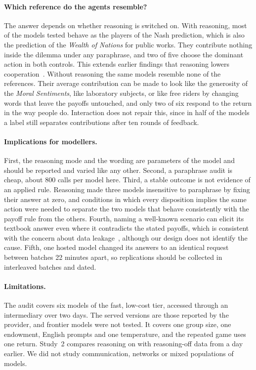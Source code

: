 \documentclass[runningheads]{llncs}
\begin{document}
\paragraph{Which reference do the agents resemble?} The answer depends on whether reasoning is switched on. With reasoning, most of the models tested behave as the players of the Nash prediction, which is also the prediction of the \emph{Wealth of Nations} for public works. They contribute nothing inside the dilemma under any paraphrase, and two of five choose the dominant action in both controls. This extends earlier findings that reasoning lowers cooperation~\cite{li2025spontaneous,kitadai2025reasoning}. Without reasoning the same models resemble none of the references. Their average contribution can be made to look like the generosity of the \emph{Moral Sentiments}, like laboratory subjects, or like free riders by changing words that leave the payoffs untouched, and only two of six respond to the return in the way people do. Interaction does not repair this, since in half of the models a label still separates contributions after ten rounds of feedback.

\paragraph{Implications for modellers.} First, the reasoning mode and the wording are parameters of the model and should be reported and varied like any other. Second, a paraphrase audit is cheap, about 800 calls per model here. Third, a stable outcome is not evidence of an applied rule. Reasoning made three models insensitive to paraphrase by fixing their answer at zero, and conditions in which every disposition implies the same action were needed to separate the two models that behave consistently with the payoff rule from the others. Fourth, naming a well-known scenario can elicit its textbook answer even where it contradicts the stated payoffs, which is consistent with the concern about data leakage~\cite{larooij2026validation}, although our design does not identify the cause. Fifth, one hosted model changed its answers to an identical request between batches 22 minutes apart, so replications should be collected in interleaved batches and dated.

\paragraph{Limitations.} The audit covers six models of the fast, low-cost tier, accessed through an intermediary over two days. The served versions are those reported by the provider, and frontier models were not tested. It covers one group size, one endowment, English prompts and one temperature, and the repeated game uses one return. Study~2 compares reasoning on with reasoning-off data from a day earlier. We did not study communication, networks or mixed populations of models.
\end{document}
